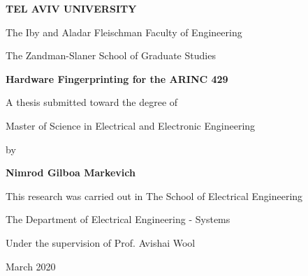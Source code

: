 \begin{titlepage}
\begin{center}
  \vspace*{1cm}
  
  \Large
  \textbf{TEL AVIV UNIVERSITY}
  
  \normalsize
  The Iby and Aladar Fleischman Faculty of Engineering
  
  The Zandman-Slaner School of Graduate Studies
  
  \vspace{0.5cm}
  \LARGE
  \textbf{Hardware Fingerprinting for the ARINC 429}
  
  \vspace{0.5cm}
  
  \vspace{1cm}
  \normalsize
   A thesis submitted toward the degree of
   
   Master of Science in Electrical and Electronic Engineering
   
   \vspace{0.5cm}
   by
   
  \Large
  \textbf{Nimrod Gilboa Markevich}
  
  \vspace{1 cm}
  \normalsize
  This research was carried out in The School of Electrical Engineering
  
  The Department of Electrical Engineering - Systems
  
  Under the supervision of Prof. Avishai Wool
  
  \vspace{0.5cm}
  \large
  March 2020
  
\end{center}
\end{titlepage}

